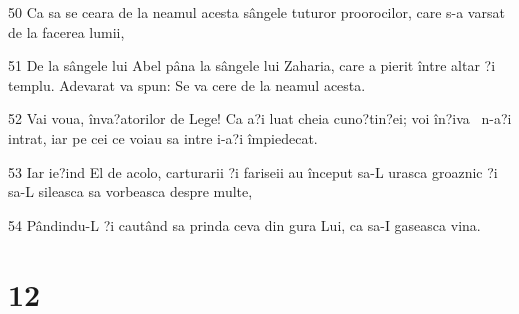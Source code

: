 \par 50 Ca sa se ceara de la neamul acesta sângele tuturor proorocilor, care s-a varsat de la facerea lumii,
\par 51 De la sângele lui Abel pâna la sângele lui Zaharia, care a pierit între altar ?i templu. Adevarat va spun: Se va cere de la neamul acesta.
\par 52 Vai voua, înva?atorilor de Lege! Ca a?i luat cheia cuno?tin?ei; voi în?iva  n-a?i intrat, iar pe cei ce voiau sa intre i-a?i împiedecat.
\par 53 Iar ie?ind El de acolo, carturarii ?i fariseii au început sa-L urasca groaznic ?i sa-L sileasca sa vorbeasca despre multe,
\par 54 Pândindu-L ?i cautând sa prinda ceva din gura Lui, ca sa-I gaseasca vina.

\chapter{12}

